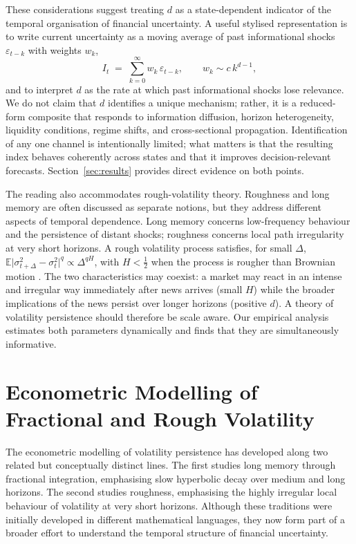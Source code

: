 \documentclass[11pt,a4paper]{article}
\newcommand{\E}{\mathbb{E}}
\begin{document}
These considerations suggest treating $d$ as a state-dependent indicator
of the temporal organisation of financial uncertainty. A useful stylised
representation is to write current uncertainty as a moving average of past
informational shocks $\varepsilon_{t-k}$ with weights $w_k$,
\begin{equation}
  I_t \;=\; \sum_{k=0}^{\infty} w_k\, \varepsilon_{t-k}, \qquad
  w_k \sim c\, k^{d-1},
  \label{eq:info-persistence}
\end{equation}
and to interpret $d$ as the rate at which past informational shocks lose
relevance. We do not claim that $d$ identifies a unique mechanism; rather,
it is a reduced-form composite that responds to information diffusion,
horizon heterogeneity, liquidity conditions, regime shifts, and
cross-sectional propagation. Identification of any one channel is
intentionally limited; what matters is that the resulting index behaves
coherently across states and that it improves decision-relevant forecasts.
Section~\ref{sec:results} provides direct evidence on both points.

The reading also accommodates rough-volatility theory. Roughness and long
memory are often discussed as separate notions, but they address different
aspects of temporal dependence. Long memory concerns low-frequency
behaviour and the persistence of distant shocks; roughness concerns local
path irregularity at very short horizons. A rough volatility process
satisfies, for small $\Delta$,
$\E\bigl|\sigma^2_{t+\Delta}-\sigma^2_t\bigr|^q \propto \Delta^{qH}$,
with $H<\tfrac12$ when the process is rougher than Brownian motion
\citep{gatheral2018volatility}. The two characteristics may coexist:
a market may react in an intense and irregular way immediately after news
arrives (small $H$) while the broader implications of the news persist
over longer horizons (positive $d$). A theory of volatility persistence
should therefore be scale aware. Our empirical analysis estimates both
parameters dynamically and finds that they are simultaneously informative.

\section{Econometric Modelling of Fractional and Rough Volatility}
\label{sec:econometrics}

The econometric modelling of volatility persistence has developed along
two related but conceptually distinct lines. The first studies long memory
through fractional integration, emphasising slow hyperbolic decay over
medium and long horizons. The second studies roughness, emphasising the
highly irregular local behaviour of volatility at very short horizons.
Although these traditions were initially developed in different
mathematical languages, they now form part of a broader effort to
understand the temporal structure of financial uncertainty.
\end{document}
